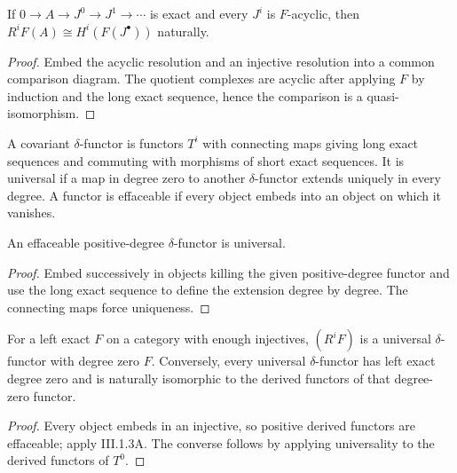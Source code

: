 \begin{proposition}
\label{ha-ch3-prop-acyclic-resolution}
If $0\to A\to J^0\to J^1\to\cdots$ is exact and every $J^i$ is
$F$-acyclic, then $R^iF(A)\cong H^i(F(J^\bullet))$ naturally.

\end{proposition}
\begin{proof}

Embed the acyclic resolution and an injective resolution into a common
comparison diagram.  The quotient complexes are acyclic after applying $F$
by induction and the long exact sequence, hence the comparison is a
quasi-isomorphism.

\end{proof}

\begin{definition}
\label{ha-ch3-def-delta}
A covariant $\delta$-functor is functors $T^i$ with connecting maps giving
long exact sequences and commuting with morphisms of short exact sequences.
It is universal if a map in degree zero to another $\delta$-functor extends
uniquely in every degree.  A functor is effaceable if every object embeds into
an object on which it vanishes.
\end{definition}

\begin{theorem}
\label{ha-ch3-thm-effaceable}
An effaceable positive-degree $\delta$-functor is universal.

\end{theorem}
\begin{proof}

Embed successively in objects killing the given positive-degree functor and
use the long exact sequence to define the extension degree by degree.  The
connecting maps force uniqueness.

\end{proof}

\begin{corollary}
\label{ha-ch3-cor-universal-derived}
For a left exact $F$ on a category with enough injectives, $(R^iF)$ is a
universal $\delta$-functor with degree zero $F$.  Conversely, every universal
$\delta$-functor has left exact degree zero and is naturally isomorphic to the
derived functors of that degree-zero functor.

\end{corollary}
\begin{proof}

Every object embeds in an injective, so positive derived functors are
effaceable; apply III.1.3A.  The converse follows by applying universality to
the derived functors of $T^0$.

\end{proof}

